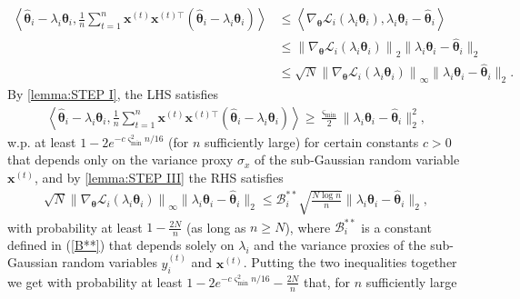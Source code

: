 \documentclass{article} %
\def\eqref#1{equation~\ref{#1}}
\renewcommand{\eqref}[1]{(\ref{#1})}
\begin{document}
$$
\begin{aligned}
\left\langle\widehat{\boldsymbol{\theta}}_{i}-\lambda_i\boldsymbol{\theta}_i, \frac{1}{n} \sum_{t=1}^n \mathbf{x}^{(t)} \mathbf{x}^{(t) \top}(\widehat{\boldsymbol{\theta}}_{i}-\lambda_i\boldsymbol{\theta}_i)\right\rangle & \leq\left\langle\nabla_{\boldsymbol{\theta}} \mathscr{L}_i\left(\lambda_i\boldsymbol{\theta}_i\right), \lambda_i\boldsymbol{\theta}_i-\widehat{\boldsymbol{\theta}}_{i}\right\rangle\\
&\leq \left\|\nabla_{\boldsymbol{\theta}} \mathscr{L}_i\left(\lambda_i\boldsymbol{\theta}_i\right)\right\|_{2}  \|\lambda_i\boldsymbol{\theta}_i-\widehat{\boldsymbol{\theta}}_{i} \|_{2}\\
&\leq \sqrt{N}\left\|\nabla_{\boldsymbol{\theta}} \mathscr{L}_i\left(\lambda_i\boldsymbol{\theta}_i\right)\right\|_{\infty} \|\lambda_i\boldsymbol{\theta}_i-\widehat{\boldsymbol{\theta}}_{i}\|_{2}.
\end{aligned}
$$
\noindent
By \cref{lemma:STEP I}, the LHS satisfies
$$
\begin{aligned}
\left\langle\widehat{\boldsymbol{\theta}}_{i}-\lambda_i\boldsymbol{\theta}_i, \frac{1}{n} \sum_{t=1}^n \mathbf{x}^{(t)} \mathbf{x}^{(t) \top}(\widehat{\boldsymbol{\theta}}_{i}-\lambda_i\boldsymbol{\theta}_i)\right\rangle  \geq \frac{\varsigma_{\min}}{2} \|\lambda_i\boldsymbol{\theta}_i-\widehat{\boldsymbol{\theta}}_{i}\|_{2}^2,
\end{aligned}
$$
w.p. at least $1-2 e^{-c \varsigma_{\min}^{2} n / 16}$ (for $n$ sufficiently large) for certain constants $c>0$ that depends only on the variance proxy $\sigma_x$ of the sub-Gaussian random variable $\mathbf{x}^{(t)}$, and by \cref{lemma:STEP III} the RHS satisfies 
$$
\begin{aligned}
\sqrt{N}\left\|\nabla_{\boldsymbol{\theta}} \mathscr{L}_i\left(\lambda_i\boldsymbol{\theta}_i\right)\right\|_{\infty} \|\lambda_i\boldsymbol{\theta}_i-\widehat{\boldsymbol{\theta}}_{i}\|_{2} \leq  \mathscr{B}_i^{**} \sqrt{\frac{N\log n}{n}}\|\lambda_i\boldsymbol{\theta}_i-\widehat{\boldsymbol{\theta}}_{i}\|_{2},
\end{aligned}
$$
with probability at least $1-\frac{2N}{n}$ (as long as $n \geq N$), where $\mathscr{B}_i^{**}$ is a constant defined in \eqref{B**} that depends solely on $\lambda_i$ and the variance proxies of the sub-Gaussian random variables $y_i^{(t)}$ and $\mathbf{x}^{(t)}$. Putting the two inequalities together we get with probability at least $1- 2e^{-c \varsigma_{\min}^{2} n / 16}-\tfrac{2N}{n}$ that, for $n$ sufficiently large
\end{document}
